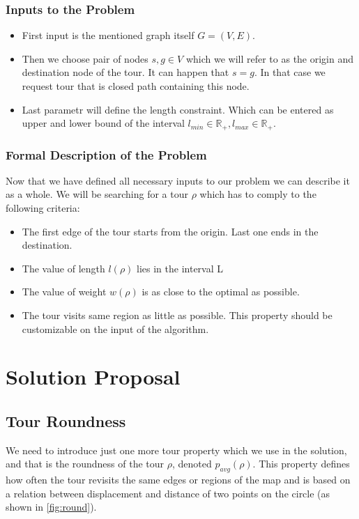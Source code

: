 \documentclass{ctuthesis}
\begin{document}
\subsection{Inputs to the Problem}
\begin{itemize}
	\item First input is the mentioned graph itself \(G=(V, E)\).
	\item Then we choose pair of nodes \(s, g \in V\) which we will refer to as the origin and destination node of the tour. It can happen that \(s = g\). In that case we request tour that is closed path containing this node.
	\item Last parametr will define the length constraint. Which can be entered as upper and lower bound of the interval \(l_{min} \in \mathbb{R_+}, l_{max} \in \mathbb{R_+}\).
\end{itemize}

\subsection{Formal Description of the Problem}
Now that we have defined all necessary inputs to our problem we can describe it as a whole. We will be searching for a tour \(\rho\) which has to comply to the following criteria:
\begin{itemize}
	\item The first edge of the tour starts from the origin. Last one ends in the destination.
	\item The value of length \(l(\rho)\) lies in the interval L
	\item The value of weight \(w(\rho)\) is as close to the optimal as possible.
	\item The tour visits same region as little as possible. This property should be customizable on the input of the algorithm.
\end{itemize}

\chapter{Solution Proposal} \label{chap:solution}

\section{Tour Roundness} \label{sec:round}
We need to introduce just one more tour property which we use in the solution, and that is the roundness of the tour \(\rho\), denoted \(p_{avg}(\rho)\). This property defines how often the tour revisits the same edges or regions of the map and is based on a relation between displacement and distance of two points on the circle (as shown in \ref{fig:round}).  \par
\end{document}
